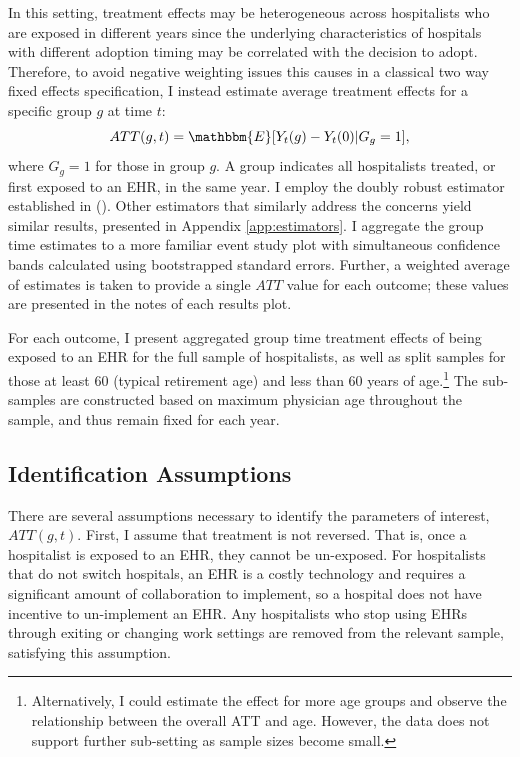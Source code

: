 \documentclass[12pt]{article}
\begin{document}
In this setting, treatment effects may be heterogeneous across hospitalists who are exposed in different years since the underlying characteristics of hospitals with different adoption timing may be correlated with the decision to adopt. Therefore, to avoid negative weighting issues this causes in a classical two way fixed effects specification, I instead estimate average treatment effects for a specific group $g$ at time $t$: 
$$ATT(g,t)=\mathbbm{E}[Y_t(g)-Y_t(0)|G_g=1],$$
where $G_g=1$ for those in group $g$. A group indicates all hospitalists treated, or first exposed to an EHR, in the same year. I employ the doubly robust estimator established in \citeauthor{sant2020doubly} (\citeyear{sant2020doubly}). Other estimators that similarly address the concerns yield similar results, presented in Appendix \ref{app:estimators}. I aggregate the group time estimates to a more familiar event study plot with simultaneous confidence bands calculated using bootstrapped standard errors. Further, a weighted average of estimates is taken to provide a single $ATT$ value for each outcome; these values are presented in the notes of each results plot. 

For each outcome, I present aggregated group time treatment effects of being exposed to an EHR for the full sample of hospitalists, as well as split samples for those at least 60 (typical retirement age) and less than 60 years of age.\footnote{Alternatively, I could estimate the effect for more age groups and observe the relationship between the overall ATT and age. However, the data does not support further sub-setting as sample sizes become small.} The sub-samples are constructed based on maximum physician age throughout the sample, and thus remain fixed for each year.

\subsection{Identification Assumptions}

There are several assumptions necessary to identify the parameters of interest, $ATT(g,t)$. First, I assume that treatment is not reversed. That is, once a hospitalist is exposed to an EHR, they cannot be un-exposed. For hospitalists that do not switch hospitals, an EHR is a costly technology and requires a significant amount of collaboration to implement, so a hospital does not have incentive to un-implement an EHR. Any hospitalists who stop using EHRs through exiting or changing work settings are removed from the relevant sample, satisfying this assumption.
\end{document}
